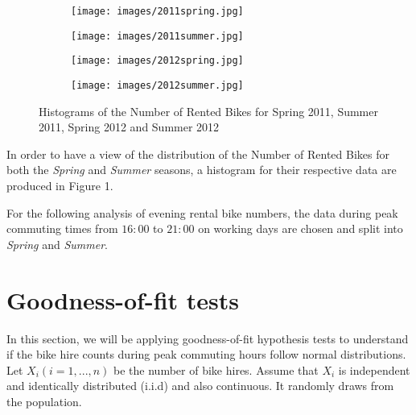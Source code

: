 \begin{figure}[h]

\begin{subfigure}{0.49\textwidth}
\texttt{[image: images/2011spring.jpg]} 

\label{fig:subim2.1}
\end{subfigure}
\begin{subfigure}{0.49\textwidth}
\texttt{[image: images/2011summer.jpg]}

\label{fig:subim2.2}
\end{subfigure}
\begin{subfigure}{0.49\textwidth}
\texttt{[image: images/2012spring.jpg]} 

\label{fig:subim2.3}
\end{subfigure}
\begin{subfigure}{0.49\textwidth}
\texttt{[image: images/2012summer.jpg]}

\label{fig:subim2.4}
\end{subfigure}
\caption{Histograms of the Number of Rented Bikes for Spring 2011, Summer 2011, Spring 2012 and Summer 2012}
\label{fig:image2}
\end{figure}

In order to have a view of the distribution of the Number of Rented Bikes for both the \textit{Spring} and \textit{Summer} seasons, a histogram for their respective data are produced in Figure 1.

For the following analysis of evening rental bike numbers, the data during peak commuting times from $16:00$ to $21:00$ on working days are chosen and split into \textit{Spring} and \textit{Summer}.

\section{Goodness-of-fit tests}
In this section, we will be applying goodness-of-fit hypothesis tests to understand if the bike hire counts during peak commuting hours follow normal distributions. Let $X_i(i=1,...,n)$ be the number of bike hires. Assume that $X_i$ is independent and identically distributed (i.i.d) and also continuous. It randomly draws from the population.

